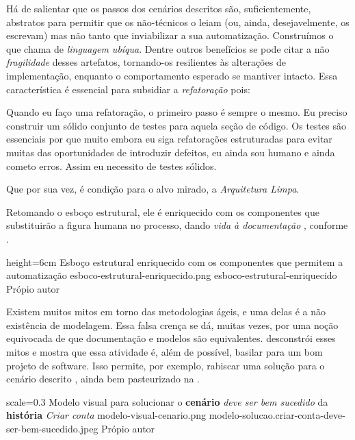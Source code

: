   Há de salientar que os passos dos cenários descritos são, suficientemente, abstratos para permitir que os não-técnicos o leiam (ou, ainda, desejavelmente, os escrevam) mas não tanto que inviabilizar a sua automatização. Construímos o que  chama de \emph{linguagem ubíqua}. Dentre outros benefícios se pode citar a não \emph{fragilidade}\cite[pág. 93, tradução nossa]{RoseWynneHellesoy2015} desses artefatos, tornando-os resilientes às alterações de implementação, enquanto o comportamento esperado se mantiver intacto. Essa característica é essencial para subsidiar a \emph{refatoração} pois:

  \citacaolonga
    {Quando eu faço uma refatoração, o primeiro passo é sempre o mesmo. Eu preciso construir um sólido conjunto de testes para aquela seção de código. Os testes são essenciais por que muito embora eu siga refatorações estruturadas para evitar muitas das oportunidades de introduzir defeitos, eu ainda sou humano e ainda cometo erros. Assim eu necessito de testes sólidos.}
    {\cite[p.  17, tradução nossa]{Fowler1999}}

  Que por sua vez, é condição para o alvo mirado, a \emph{Arquitetura Limpa}.

  Retomando o esboço estrutural, ele é enriquecido com os componentes que substituirão a figura humana no processo, dando \emph{vida à documentação} \cite[pág. 29, tradução nossa]{Adzic2011}, conforme .

  \imagem
    {height=6cm}
    {Esboço estrutural enriquecido com os componentes que permitem a automatização}
    {esboco-estrutural-enriquecido.png}
    {esboco-estrutural-enriquecido}
    {Própio autor}

  Existem muitos mitos em torno das metodologias ágeis, e uma delas é a não existência de modelagem. Essa falsa crença se dá, muitas vezes, por uma noção equivocada de que documentação e modelos são equivalentes.  desconstrói esses mitos e mostra que essa atividade é, além de possível, basilar para um bom projeto de software. Isso permite, por exemplo, rabiscar uma solução para o cenário descrito \cite[pág. 57]{Ruby2011}, ainda bem pasteurizado na .

  \imagem
    {scale=0.3}
    {Modelo visual para solucionar o \textbf{cenário} \emph{deve ser bem sucedido} da \textbf{história} \emph{Criar conta}}
    {modelo-visual-cenario.png}
    {modelo-solucao.criar-conta-deve-ser-bem-sucedido.jpeg}
    {Própio autor\footnotemark}

